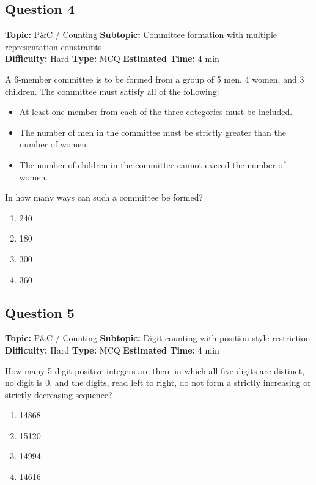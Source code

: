 \documentclass[11pt,a4paper]{article}
\begin{document}
\subsection*{Question 4}
\textbf{Topic:} P\&C / Counting \quad
\textbf{Subtopic:} Committee formation with multiple representation constraints \\
\textbf{Difficulty:} Hard \quad
\textbf{Type:} MCQ \quad
\textbf{Estimated Time:} 4 min
\begin{tcolorbox}[qbox]
A 6-member committee is to be formed from a group of 5 men, 4 women, and 3 children. The committee must satisfy all of the following:
\begin{itemize}[leftmargin=*,topsep=0pt,itemsep=0pt]
    \item At least one member from each of the three categories must be included.
    \item The number of men in the committee must be strictly greater than the number of women.
    \item The number of children in the committee cannot exceed the number of women.
\end{itemize}
In how many ways can such a committee be formed?
\end{tcolorbox}
\begin{enumerate}[label=(\Alph*)]
\item 240
\item 180
\item 300
\item 360
\end{enumerate}

\subsection*{Question 5}
\textbf{Topic:} P\&C / Counting \quad
\textbf{Subtopic:} Digit counting with position-style restriction \\
\textbf{Difficulty:} Hard \quad
\textbf{Type:} MCQ \quad
\textbf{Estimated Time:} 4 min
\begin{tcolorbox}[qbox]
How many 5-digit positive integers are there in which all five digits are distinct, no digit is 0, and the digits, read left to right, do not form a strictly increasing or strictly decreasing sequence?
\end{tcolorbox}
\begin{enumerate}[label=(\Alph*)]
\item 14868
\item 15120
\item 14994
\item 14616
\end{enumerate}
\end{document}
